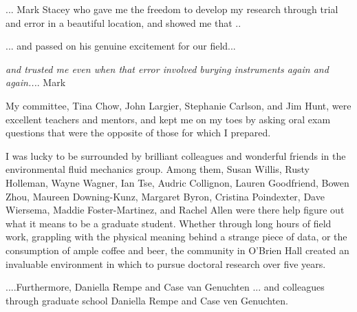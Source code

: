 \documentclass{ucbthesis}
\begin{document}
\begin{frontmatter}


\tableofcontents
\clearpage
\listoffigures
\listoftables

\begin{acknowledgements}

... Mark Stacey who gave me the freedom to develop my research through trial and error in a beautiful location, and showed me that .. 

... and passed on his genuine excitement for our field... 

\emph{and trusted me even when that error involved burying instruments again and again...}. Mark 


My committee, Tina Chow, John Largier, Stephanie Carlson, and Jim Hunt, were excellent teachers and mentors, and kept me on my toes by asking oral exam questions that were the opposite of those for which I prepared.

I was lucky to be surrounded by brilliant colleagues and wonderful friends in the environmental fluid mechanics group. Among them, Susan Willis, Rusty Holleman, Wayne Wagner, Ian Tse, Audric Collignon, Lauren Goodfriend, Bowen Zhou, Maureen Downing-Kunz, Margaret Byron, Cristina Poindexter, Dave Wiersema, Maddie Foster-Martinez, and Rachel Allen were there help figure out what it means to be a graduate student.  Whether through long hours of field work, grappling with the physical meaning behind a strange piece of data, or the consumption of ample coffee and beer, the community in O'Brien Hall created an invaluable environment in which to pursue doctoral research over five years. 

....Furthermore, Daniella Rempe and Case van Genuchten 
... and colleagues through graduate school Daniella Rempe and Case ven Genuchten. 


\end{acknowledgements}
\end{frontmatter}
\end{document}
